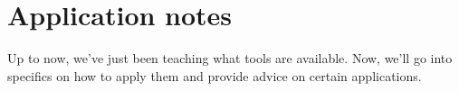 
\chapter{Application notes}

Up to now, we've just been teaching what tools are available. Now, we'll go into
specifics on how to apply them and provide advice on certain applications.





